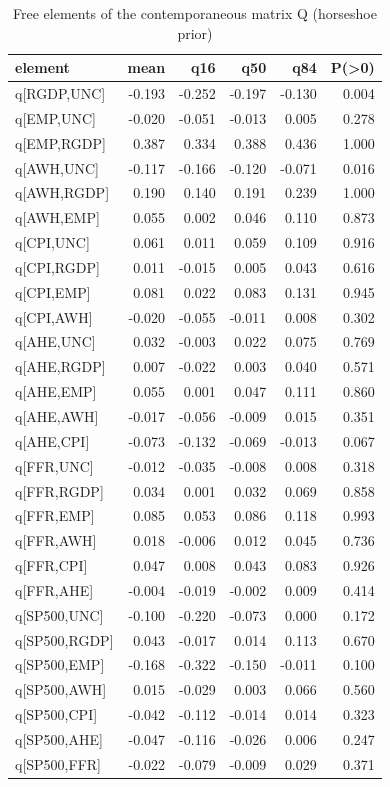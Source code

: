 \begin{table}[htbp]
\centering
\caption{Free elements of the contemporaneous matrix Q (horseshoe prior)}
\label{tab:Q}
\begin{tabular}{lrrrrr}
\toprule
element & mean & q16 & q50 & q84 & P(>0) \\
\midrule
q[RGDP,UNC] & -0.193 & -0.252 & -0.197 & -0.130 & 0.004 \\
q[EMP,UNC] & -0.020 & -0.051 & -0.013 & 0.005 & 0.278 \\
q[EMP,RGDP] & 0.387 & 0.334 & 0.388 & 0.436 & 1.000 \\
q[AWH,UNC] & -0.117 & -0.166 & -0.120 & -0.071 & 0.016 \\
q[AWH,RGDP] & 0.190 & 0.140 & 0.191 & 0.239 & 1.000 \\
q[AWH,EMP] & 0.055 & 0.002 & 0.046 & 0.110 & 0.873 \\
q[CPI,UNC] & 0.061 & 0.011 & 0.059 & 0.109 & 0.916 \\
q[CPI,RGDP] & 0.011 & -0.015 & 0.005 & 0.043 & 0.616 \\
q[CPI,EMP] & 0.081 & 0.022 & 0.083 & 0.131 & 0.945 \\
q[CPI,AWH] & -0.020 & -0.055 & -0.011 & 0.008 & 0.302 \\
q[AHE,UNC] & 0.032 & -0.003 & 0.022 & 0.075 & 0.769 \\
q[AHE,RGDP] & 0.007 & -0.022 & 0.003 & 0.040 & 0.571 \\
q[AHE,EMP] & 0.055 & 0.001 & 0.047 & 0.111 & 0.860 \\
q[AHE,AWH] & -0.017 & -0.056 & -0.009 & 0.015 & 0.351 \\
q[AHE,CPI] & -0.073 & -0.132 & -0.069 & -0.013 & 0.067 \\
q[FFR,UNC] & -0.012 & -0.035 & -0.008 & 0.008 & 0.318 \\
q[FFR,RGDP] & 0.034 & 0.001 & 0.032 & 0.069 & 0.858 \\
q[FFR,EMP] & 0.085 & 0.053 & 0.086 & 0.118 & 0.993 \\
q[FFR,AWH] & 0.018 & -0.006 & 0.012 & 0.045 & 0.736 \\
q[FFR,CPI] & 0.047 & 0.008 & 0.043 & 0.083 & 0.926 \\
q[FFR,AHE] & -0.004 & -0.019 & -0.002 & 0.009 & 0.414 \\
q[SP500,UNC] & -0.100 & -0.220 & -0.073 & 0.000 & 0.172 \\
q[SP500,RGDP] & 0.043 & -0.017 & 0.014 & 0.113 & 0.670 \\
q[SP500,EMP] & -0.168 & -0.322 & -0.150 & -0.011 & 0.100 \\
q[SP500,AWH] & 0.015 & -0.029 & 0.003 & 0.066 & 0.560 \\
q[SP500,CPI] & -0.042 & -0.112 & -0.014 & 0.014 & 0.323 \\
q[SP500,AHE] & -0.047 & -0.116 & -0.026 & 0.006 & 0.247 \\
q[SP500,FFR] & -0.022 & -0.079 & -0.009 & 0.029 & 0.371 \\
\bottomrule
\end{tabular}
\end{table}